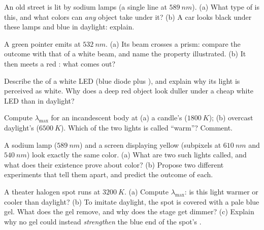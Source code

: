 \begin{exercise}[$\star\star$]\label{exo:g11:color-light-sources:8}
An old street is lit by  sodium lamps (a single line at
$\qty{589}{nm}$). (a) What type of  is this, and what colors
can \emph{any} object take under it? (b) A car looks black under these
lamps and blue in daylight: explain.
\end{exercise}

\begin{exercise}[$\star\star$]\label{exo:g11:color-light-sources:9}
A green  pointer emits at $\qty{532}{nm}$. (a) Its beam crosses a
prism: compare the outcome with that of a white beam, and name the
property illustrated. (b) It then meets a red : what comes out?
\end{exercise}

\begin{exercise}[$\star\star$]\label{exo:g11:color-light-sources:10}
Describe the  of a white LED (blue diode plus ), and
explain why its light is perceived as white. Why does a deep red object
look duller under a cheap white LED than in daylight?
\end{exercise}

\begin{exercise}[$\star\star$]\label{exo:g11:color-light-sources:11}
Compute $\lambda_{\max}$ for an incandescent body at (a) a candle's
 ($\qty{1800}{K}$); (b) overcast daylight's
($\qty{6500}{K}$). Which of the two lights is called ``warm''? Comment.
\end{exercise}

\begin{exercise}[$\star\star\star$]\label{exo:g11:color-light-sources:12}
A sodium lamp ($\qty{589}{nm}$) and a screen displaying yellow
(subpixels at $\qty{610}{nm}$ and $\qty{540}{nm}$) look exactly the same
color. (a) What are two such lights called, and what does their
existence prove about color? (b) Propose two different experiments that
tell them apart, and predict the outcome of each.
\end{exercise}

\begin{exercise}[$\star\star\star$]\label{exo:g11:color-light-sources:13}
A theater halogen spot runs at $\qty{3200}{K}$. (a) Compute
$\lambda_{\max}$: is this light warmer or cooler than daylight? (b) To
imitate daylight, the spot is covered with a pale blue gel. What does
the gel remove, and why does the stage get dimmer? (c) Explain why no
gel could instead \emph{strengthen} the blue end of the spot's .
\end{exercise}

